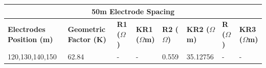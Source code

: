 \documentclass[12pt,a4paper]{report}
\begin{document}
\begin{itemize}
\begin{table}[H]
    \centering
    \begin{adjustbox}{max width=\textwidth}
    \setlength{\tabcolsep}{15pt}
    \renewcommand{\arraystretch}{1.5}
    \begin{tabular}{|p{3.5cm}|p{2.5cm}|p{1.8cm}|p{2.2cm}|p{1.8cm}|p{2.2cm}|p{1.8cm}|p{2.2cm}|}
    \hline
    \multicolumn{8}{|c|}{\rule{0pt}{3em}\huge\textbf{50m Electrode Spacing}} \\ [0.5cm]
    \hline
    \textbf{Electrodes Position (m)} & \textbf{Geometric Factor (K)} & \textbf{R1 ($\Omega$)} & \textbf{KR1 ($\Omega$m)} & \textbf{R2 ($\Omega$)} & \textbf{KR2 ($\Omega$m)} & \textbf{R ($\Omega$)} & \textbf{KR3 ($\Omega$m)} \\ \hline
    120,130,140,150 & 62.84 & - & - & 0.559 & 35.12756 & - & - \\ \hline
    \end{tabular}
\end{adjustbox}
\end{table}

\end{itemize}
\end{document}
